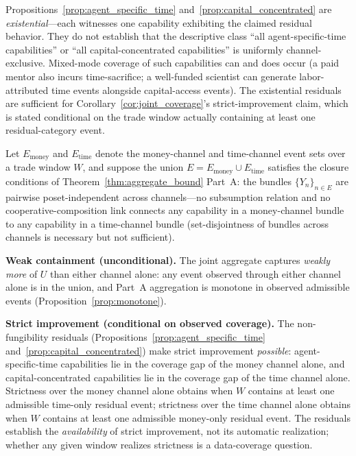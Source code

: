 \begin{remark}
\label{rem:residual_scope}
Propositions~\ref{prop:agent_specific_time}
and~\ref{prop:capital_concentrated} are
\emph{existential}---each witnesses one capability exhibiting
the claimed residual behavior.  They do not establish that the
descriptive class ``all agent-specific-time capabilities'' or
``all capital-concentrated capabilities'' is uniformly
channel-exclusive.  Mixed-mode coverage of such capabilities can
and does occur (a paid mentor also incurs time-sacrifice; a
well-funded scientist can generate labor-attributed time events
alongside capital-access events).  The existential residuals
are sufficient for Corollary~\ref{cor:joint_coverage}'s
strict-improvement claim, which is stated conditional on the
trade window actually containing at least one residual-category
event.
\end{remark}

\begin{corollary}
\label{cor:joint_coverage}
Let $E_{\mathrm{money}}$ and $E_{\mathrm{time}}$ denote the
money-channel and time-channel event sets over a trade window
$W$, and suppose the union $E = E_{\mathrm{money}} \cup
E_{\mathrm{time}}$ satisfies the closure conditions of
Theorem~\ref{thm:aggregate_bound} Part~A: the bundles
$\{Y_n\}_{n \in E}$ are pairwise poset-independent across
channels---no subsumption relation and no cooperative-composition
link connects any capability in a money-channel bundle to any
capability in a time-channel bundle (set-disjointness of
bundles across channels is necessary but not sufficient).

\medskip\noindent
\textbf{Weak containment (unconditional).}
The joint aggregate captures \emph{weakly more} of $U$ than
either channel alone: any event observed through either channel
alone is in the union, and Part~A aggregation is monotone in
observed admissible events (Proposition~\ref{prop:monotone}).

\medskip\noindent
\textbf{Strict improvement (conditional on observed coverage).}
The non-fungibility residuals
(Propositions~\ref{prop:agent_specific_time}
and~\ref{prop:capital_concentrated}) make strict improvement
\emph{possible}: agent-specific-time capabilities lie in the
coverage gap of the money channel alone, and
capital-concentrated capabilities lie in the coverage gap of the
time channel alone.  Strictness over the money channel alone
obtains when $W$ contains at least one admissible time-only
residual event; strictness over the time channel alone obtains
when $W$ contains at least one admissible money-only residual
event.  The residuals establish the \emph{availability} of
strict improvement, not its automatic realization; whether any
given window realizes strictness is a data-coverage question.
\end{corollary}

